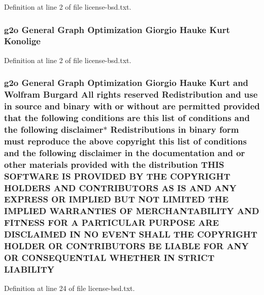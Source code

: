 Definition at line 2 of file license-\/bsd.\+txt.

\subsubsection[{\texorpdfstring{Konolige}{Konolige}}]{\setlength{\rightskip}{0pt plus 5cm}g2o General Graph Optimization Giorgio Hauke Kurt Konolige}\hypertarget{license-bsd_8txt_af76ecd2524130a4347b552d1e153dc48}{}\label{license-bsd_8txt_af76ecd2524130a4347b552d1e153dc48}


Definition at line 2 of file license-\/bsd.\+txt.

\subsubsection[{\texorpdfstring{L\+I\+A\+B\+I\+L\+I\+TY}{LIABILITY}}]{\setlength{\rightskip}{0pt plus 5cm}g2o General Graph Optimization Giorgio Hauke Kurt and Wolfram Burgard All rights reserved Redistribution and use in source and binary with or without are permitted provided that the following conditions are this list of conditions and the following disclaimer$\ast$ Redistributions in binary form must reproduce the above copyright this list of conditions and the following disclaimer in the documentation and or other materials provided with the distribution T\+H\+IS S\+O\+F\+T\+W\+A\+RE IS P\+R\+O\+V\+I\+D\+ED BY T\+HE C\+O\+P\+Y\+R\+I\+G\+HT H\+O\+L\+D\+E\+RS A\+ND C\+O\+N\+T\+R\+I\+B\+U\+T\+O\+RS AS IS A\+ND A\+NY E\+X\+P\+R\+E\+SS OR I\+M\+P\+L\+I\+ED B\+UT N\+OT L\+I\+M\+I\+T\+ED T\+HE I\+M\+P\+L\+I\+ED {\bf W\+A\+R\+R\+A\+N\+T\+I\+ES} OF M\+E\+R\+C\+H\+A\+N\+T\+A\+B\+I\+L\+I\+TY A\+ND F\+I\+T\+N\+E\+SS F\+OR A P\+A\+R\+T\+I\+C\+U\+L\+AR P\+U\+R\+P\+O\+SE A\+RE D\+I\+S\+C\+L\+A\+I\+M\+ED IN NO E\+V\+E\+NT S\+H\+A\+LL T\+HE C\+O\+P\+Y\+R\+I\+G\+HT H\+O\+L\+D\+ER OR C\+O\+N\+T\+R\+I\+B\+U\+T\+O\+RS BE L\+I\+A\+B\+LE F\+OR A\+NY OR C\+O\+N\+S\+E\+Q\+U\+E\+N\+T\+I\+AL W\+H\+E\+T\+H\+ER IN S\+T\+R\+I\+CT L\+I\+A\+B\+I\+L\+I\+TY}\hypertarget{license-bsd_8txt_ae0cc4cec2fa18cd51df7738e4178f88b}{}\label{license-bsd_8txt_ae0cc4cec2fa18cd51df7738e4178f88b}


Definition at line 24 of file license-\/bsd.\+txt.

